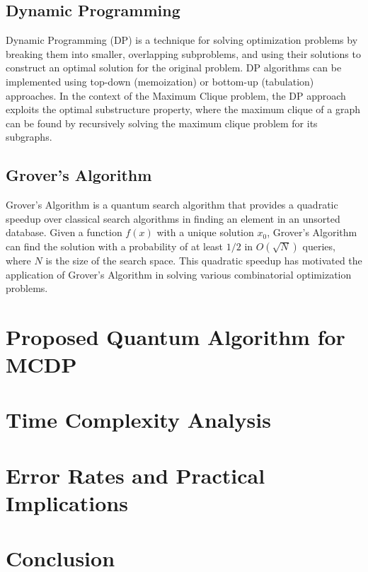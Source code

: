 \subsection{Dynamic Programming}

Dynamic Programming (DP) is a technique for solving optimization problems by breaking them into smaller, overlapping subproblems, and using their solutions to construct an optimal solution for the original problem. DP algorithms can be implemented using top-down (memoization) or bottom-up (tabulation) approaches. In the context of the Maximum Clique problem, the DP approach exploits the optimal substructure property, where the maximum clique of a graph can be found by recursively solving the maximum clique problem for its subgraphs.

\subsection{Grover's Algorithm}

Grover's Algorithm is a quantum search algorithm that provides a quadratic speedup over classical search algorithms in finding an element in an unsorted database. Given a function $f(x)$ with a unique solution $x_0$, Grover's Algorithm can find the solution with a probability of at least $1/2$ in $O(\sqrt{N})$ queries, where $N$ is the size of the search space. This quadratic speedup has motivated the application of Grover's Algorithm in solving various combinatorial optimization problems.

\section{Proposed Quantum Algorithm for MCDP}\label{sec:proposed_algorithm}

\section{Time Complexity Analysis}\label{sec:complexity_analysis}

\section{Error Rates and Practical Implications}\label{sec:error_rates_practical_implications}

\section{Conclusion}\label{sec:conclusion}

